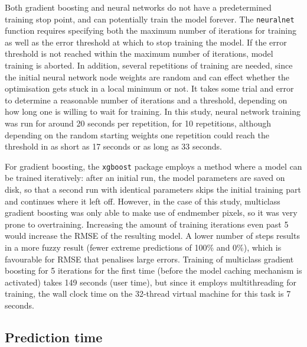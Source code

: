 \documentclass[a4paper,12pt]{scrbook}
\begin{document}
Both gradient boosting and neural networks do not have a predetermined training stop point, and can potentially train the model forever. The \texttt{neuralnet} function requires specifying both the maximum number of iterations for training as well as the error threshold at which to stop training the model. If the error threshold is not reached within the maximum number of iterations, model training is aborted. In addition, several repetitions of training are needed, since the initial neural network node weights are random and can effect whether the optimisation gets stuck in a local minimum or not. It takes some trial and error to determine a reasonable number of iterations and a threshold, depending on how long one is willing to wait for training. In this study, neural network training was run for around 20 seconds per repetition, for 10 repetitions, although depending on the random starting weights one repetition could reach the threshold in as short as 17 seconds or as long as 33 seconds.

For gradient boosting, the \texttt{xgboost} package employs a method where a model can be trained iteratively: after an initial run, the model parameters are saved on disk, so that a second run with identical parameters skips the initial training part and continues where it left off. However, in the case of this study, multiclass gradient boosting was only able to make use of endmember pixels, so it was very prone to overtraining. Increasing the amount of training iterations even past 5 would increase the RMSE of the resulting model. A lower number of steps results in a more fuzzy result (fewer extreme predictions of 100\% and 0\%), which is favourable for RMSE that penalises large errors. Training of multiclass gradient boosting for 5 iterations for the first time (before the model caching mechanism is activated) takes 149 seconds (user time), but since it employs multithreading for training, the wall clock time on the 32-thread virtual machine for this task is 7 seconds.

\subsection{Prediction time}
\end{document}
